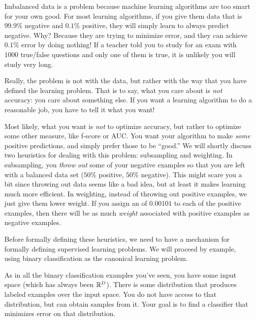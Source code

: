 Imbalanced data is a problem because machine learning algorithms are
too smart for your own good.  For most learning algorithms, if you
give them data that is $99.9\%$ negative and $0.1\%$ positive, they
will simply learn to always predict negative.  Why?  Because they are
trying to minimize error, and they can achieve $0.1\%$ error by doing
nothing!  If a teacher told you to study for an exam with $1000$
true/false questions and only one of them is true, it is unlikely you
will study very long.

Really, the problem is not with the data, but rather with the way that
you have defined the learning problem.  That is to say, what you care
about is \emph{not} accuracy: you care about something else.  If you
want a learning algorithm to do a reasonable job, you have to tell it
what you want!

Most likely, what you want is \emph{not} to optimize accuracy, but
rather to optimize some other measure, like f-score or AUC.  You want
your algorithm to make \emph{some} positive predictions, and simply
prefer those to be ``good.''  We will shortly discuss two heuristics
for dealing with this problem: subsampling and weighting.  In
subsampling, you \emph{throw out} some of your negative examples so
that you are left with a balanced data set ($50\%$ positive, $50\%$
negative).  This might scare you a bit since throwing out data seems
like a bad idea, but at least it makes learning much more efficient.
In weighting, instead of throwing out positive examples, we just give
them lower weight.  If you assign an  of
$0.00101$ to each of the positive examples, then there will be as much
\emph{weight} associated with positive examples as negative examples.

Before formally defining these heuristics, we need to have a mechanism
for formally defining supervised learning problems.  We will proceed
by example, using binary classification as the canonical learning
problem.


As in all the binary classification examples you've seen, you have
some input space (which has always been $\mathbb{R}^D$).  There is some
distribution that produces labeled examples over the input space.  You
do not have access to that distribution, but can obtain samples from
it.  Your goal is to find a classifier that minimizes error on that
distribution.


